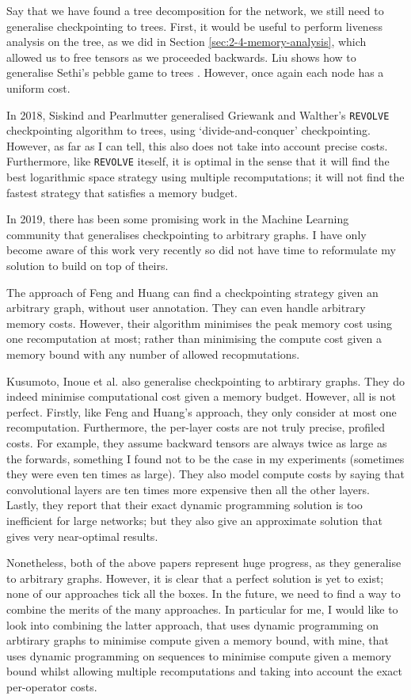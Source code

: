 Say that we have found a tree decomposition for the network, we still need to generalise checkpointing to trees.
First, it would be useful to perform liveness analysis on the tree, as we did in Section \ref{sec:2-4-memory-analysis}, which allowed us to free tensors as we proceeded backwards.
Liu shows how to generalise Sethi's pebble game to trees \cite{Liu1987}.
However, once again each node has a uniform cost.

In 2018, Siskind and Pearlmutter \cite{Siskind2018} generalised Griewank and Walther's \texttt{REVOLVE} checkpointing algorithm to trees, using `divide-and-conquer' checkpointing.
However, as far as I can tell, this also does not take into account precise costs.
Furthermore, like \texttt{REVOLVE} iteself, it is optimal in the sense that it will find the best logarithmic space strategy using multiple recomputations; it will not find the fastest strategy that satisfies a memory budget. 

In 2019, there has been some promising work in the Machine Learning community that generalises checkpointing to arbitrary graphs.
I have only become aware of this work very recently so did not have time to reformulate my solution to build on top of theirs.

The approach of Feng and Huang \cite{Feng2019} can find a checkpointing strategy given an arbitrary graph, without user annotation.
They can even handle arbitrary memory costs.
However, their algorithm minimises the peak memory cost using one recomputation at most; rather than minimising the compute cost given a memory bound with any number of allowed recopmutations.

Kusumoto, Inoue et al. \cite{Kusumoto2019} also generalise checkpointing to arbtirary graphs.
They do indeed minimise computational cost given a memory budget.
However, all is not perfect.
Firstly, like Feng and Huang's approach, they only consider at most one recomputation.
Furthermore, the per-layer costs are not truly precise, profiled costs.
For example, they assume backward tensors are always twice as large as the forwards, something I found not to be the case in my experiments (sometimes they were even ten times as large).
They also model compute costs by saying that convolutional layers are ten times more expensive then all the other layers.
Lastly, they report that their exact dynamic programming solution is too inefficient for large networks; but they also give an approximate solution that gives very near-optimal results.

Nonetheless, both of the above papers represent huge progress, as they generalise to arbitrary graphs.
However, it is clear that a perfect solution is yet to exist;
none of our approaches tick all the boxes.
In the future, we need to find a way to combine the merits of the many approaches.
In particular for me, I would like to look into combining the latter approach, that uses dynamic programming on arbtirary graphs to minimise compute given a memory bound, with mine, that uses dynamic programming on sequences to minimise compute given a memory bound whilst allowing multiple recomputations and taking into account the exact per-operator costs.
